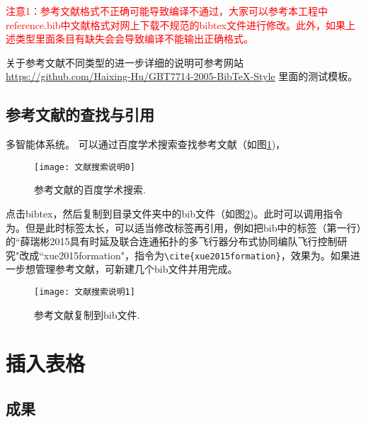 \documentclass{wreport}
\begin{document}
\textcolor{red}{注意1：参考文献格式不正确可能导致编译不通过，大家可以参考本工程中reference.bib中文献格式对网上下载不规范的bibtex文件进行修改。此外，如果上述类型里面条目有缺失会会导致编译不能输出正确格式。}

关于参考文献不同类型的进一步详细的说明可参考网站\url{https://github.com/Haixing-Hu/GBT7714-2005-BibTeX-Style}
里面的测试模板。

\subsection{参考文献的查找与引用}
多智能体系统\citep{cao2011formation}。
可以通过百度学术搜索查找参考文献（如图\ref{fig_search0})，
 \begin{figure}[!htb]
  \centering
  \texttt{[image: 文献搜索说明0]}
  \caption{参考文献的百度学术搜索.}
  \label{fig_search0}
\end{figure}
点击bibtex，然后复制到目录文件夹中的bib文件（如图\ref{fig_search1})。此时可以调用指令为\citep{薛瑞彬2015具有时延及联合连通拓扑的多飞行器分布式协同编队飞行控制研究}。但是此时标签太长，可以适当修改标签再引用，例如把bib中的标签（第一行）的``薛瑞彬2015具有时延及联合连通拓扑的多飞行器分布式协同编队飞行控制研究"改成``xue2015formation"，指令为\verb+\cite{xue2015formation}+，效果为\cite{xue2015formation}。如果进一步想管理参考文献，可新建几个bib文件并用\verb++完成。
 \begin{figure}[!htb]
  \centering
  \texttt{[image: 文献搜索说明1]}
  \caption{参考文献复制到bib文件.}
  \label{fig_search1}
\end{figure}

\section{插入表格}

\begin{table}[h]
    \caption{工作进度安排}
  \centering
  \label{gra_process}
  \end{table}

 




\myreference
{}

\myappendix
\subsection{成果}
\end{document}
